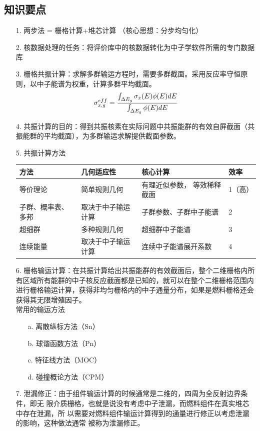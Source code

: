 \documentclass[openany]{ctexart}
\numberwithin{equation}{section} %
\begin{document}
\subsection{知识要点}
\begin{itemize}
	\item [1.]两步法 = 栅格计算+堆芯计算 \hspace*{0.3cm}（核心思想：分步均匀化）
	\item [2.]核数据处理的任务：将评价库中的核数据转化为中子学软件所需的专门数据库
	\item [3.]栅格共振计算：求解多群输运方程时，需要多群截面。采用反应率守恒原则，以中子能谱为权重，计算多群平均截面。
	\begin{equation}
	\Large	\sigma _{x,g}^{eff} = \dfrac{\int_{\Delta E_{g}} \sigma _{x}(E) \phi (E) dE}{\int_{\Delta E_{g}} \phi (E) dE}
	\end{equation}
	
	\item [4.]共振计算的目的：得到共振核素在实际问题中共振能群的有效自屛截面（共振能群的平均截面），为多群输运求解提供截面参数。
	\item [5.]共振计算方法
	\begin{table}[!ht]
		\centering
		\begin{tabular}{|l|l|l|l|}
			\hline
			方法 &  几何适应性 & 核心计算 & 效率 \\ \hline
			等价理论 & 简单规则几何 & 有理近似参数， 等效稀释截面 & 1（高） \\ \hline
			子群、概率表、多邦 & 取决于中子输运计算 & 子群参数、子群中子能谱 & 2 \\ \hline
			超细群 &  多种规则几何 & 超细群中子能谱 & 3 \\ \hline
			连续能量 & 取决于中子输运计算 &  连续中子能谱展开系数 & 4 \\ \hline
		\end{tabular}
	\end{table}
	
	\item [6.]栅格输运计算：在共振计算给出共振能群的有效截面后，整个二维栅格内所有区域所有能群的中子核反应截面都是已知的，就可以在整个二维栅格范围内进行栅格输运计算，获得非均匀栅格内的中子通量分布，如果是燃料栅格还会获得其无限增殖因子。\\
	常用的输运方法
		\vspace{-0.08cm}
	\begin{itemize}
		\item [a.]离散纵标方法（Sn）
		\vspace{-0.08cm}
			\item [b.]球谐函数方法（Pn）
			\vspace{-0.08cm}
				\item [c.]特征线方法（MOC）
				\vspace{-0.08cm}
					\item [d.]碰撞概论方法（CPM）
	\end{itemize}
	\vspace{0.1cm}
	\item [7.] 泄漏修正：由于组件输运计算的时候通常是二维的，四周为全反射边界条件，即无
	限介质栅格，也就是说没有考虑中子泄漏，而燃料组件在真实堆芯中存在泄漏，所
	以需要对燃料组件输运计算得到的通量进行修正以考虑泄漏的影响，这种做法通常
	被称为泄漏修正。
	

\end{itemize}
\end{document}
